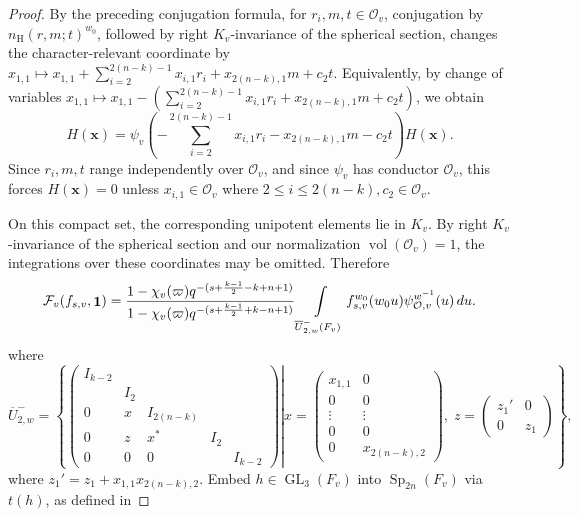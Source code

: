 \documentclass[11pt,notitlepage]{amsart}
\theoremstyle{definition}
\theoremstyle{remark}
\newcommand{\calF}{\mathcal{F}}
\newcommand{\calO}{\mathcal{O}}
\newcommand{\nHeis}{n_{\mathrm{H}}}
\DeclareMathOperator{\id}{{\bf 1}}
\DeclareMathOperator{\GL}{GL}
\DeclareMathOperator{\Sp}{Sp}
\begin{document}
\begin{proof}
By the preceding conjugation formula, for
\(r_i,m,t\in\calO_v\), conjugation by \(\nHeis(r,m;t)^{w_0}\), followed by
right \(K_v\)-invariance of the spherical section, changes the
character-relevant coordinate by $x_{1,1}
\mapsto
x_{1,1}
+\sum_{i=2}^{2(n-k)-1}x_{i,1}r_i
+x_{2(n-k),1}m
+c_2t$. Equivalently, by change of variables $x_{1,1}\mapsto
x_{1,1}
-\left(
\sum_{i=2}^{2(n-k)-1}x_{i,1}r_i
+x_{2(n-k),1}m
+c_2t
\right)$, we obtain
\[
H(\mathbf x)
=
\psi_v\!\left(
-\sum_{i=2}^{2(n-k)-1}x_{i,1}r_i
-x_{2(n-k),1}m
-c_2t
\right)H(\mathbf x).
\]
Since \(r_i,m,t\) range independently over \(\calO_v\), and since \(\psi_v\)
has conductor \(\calO_v\), this forces $H(\mathbf x)=0$
unless $x_{i,1}\in\calO_v$ where $2\le i\le 2(n-k), c_2\in\calO_v$. 

On this compact set, the corresponding unipotent elements lie in \(K_v\).
By right \(K_v\)-invariance of the spherical section and our normalization
\(\operatorname{vol}(\calO_v)=1\), the integrations over these coordinates may
be omitted. Therefore
\begin{equation}\label{int508}
  \calF_v(f_{s,v},\id) =
  \frac{1-\chi_v(\varpi)q^{-(s+\frac{k-1}{2}-k+n+1)}}{1-\chi_v(\varpi)q^{-(s+\frac{k-1}{2}+k-n+1)}}
  \int\limits_{\overline{U}^{-}_{2,w}(F_v)}
  f^{w_0}_{s,v}(w_0u) \psi^{w^{-1}}_{\calO,v}(u)\,du .
\end{equation}
where
\begin{equation}\label{def502}
  \overline{U}^{-}_{2,w} = \left\{\left.\begin{pmatrix} 
    I_{k-2}&&&&\\
    &I_2&&&\\
    0&x&I_{2(n-k)}&&\\
    0&z&x^\ast&I_2&\\
    0&0&0&&I_{k-2}
  \end{pmatrix}\right\vert
  x = \begin{pmatrix}
    x_{1,1}&0\\
    0&0\\
    \vdots&\vdots\\
    0&0\\
    0&x_{2(n-k),2}
  \end{pmatrix},\;
  z= \begin{pmatrix}
    z_1'&0\\0&z_1
  \end{pmatrix}
  \right\},
\end{equation}
where $z_1'=z_1+x_{1,1}x_{2(n-k),2}$.
\medskip
Embed \(h\in \GL_3(F_v)\) into \(\Sp_{2n}(F_v)\) via \(t(h)\), as defined in

\end{proof}
\end{document}
